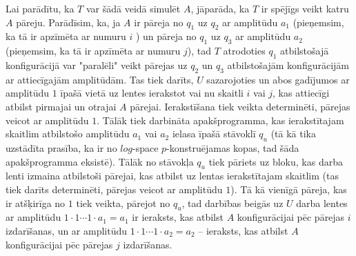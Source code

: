 \documentclass{ludis}
\begin{document}
Lai parādītu, ka $T$ var šādā veidā simulēt $A$, jāparāda, ka $T$ ir spējīgs veikt katru $A$ pāreju. Parādīsim, ka, ja $A$ ir pāreja no $q_1$ uz $q_2$ ar amplitūdu $a_1$ (pieņemsim, ka tā ir apzīmēta ar numuru $i$ ) un pāreja no $q_1$ uz $q_3$ ar amplitūdu $a_2$ (pieņemsim, ka tā ir apzīmēta ar numuru $j$), tad $T$ atrodoties $q_1$ atbilstošajā konfigurācijā var "paralēli" veikt pārejas uz $q_2$ un $q_3$ atbilstošajām konfigurācijām ar attiecīgajām amplitūdām. Tas tiek darīts, $U$ sazarojoties un abos gadījumos ar amplitūdu $1$ īpašā vietā uz lentes ierakstot vai nu skaitli $i$ vai $j$, kas attiecīgi atbilst pirmajai un otrajai $A$ pārejai. Ierakstīšana tiek veikta determinēti, pārejas veicot ar amplitūdu $1$. Tālāk tiek darbināta apakšprogramma, kas ierakstītajam skaitlim atbilstošo amplitūdu $a_1$ vai $a_2$ ielasa īpašā stāvoklī $q_u$ (tā kā tika uzstādīta prasība, ka ir no $log$-space $p$-konstruējamas kopas, tad šāda apakšprogramma eksistē). Tālāk no stāvokļa $q_u$ tiek pāriets uz bloku, kas darba lenti izmaina atbilstoši pārejai, kas atbilst uz lentas ierakstītajam skaitlim (tas tiek darīts determinēti, pārejas veicot ar amplitūdu $1$). Tā kā vienīgā pāreja, kas ir atšķirīga no $1$ tiek veikta, pārejot no $q_u$, tad darbības beigās uz $U$ darba lentes ar amplitūdu $1 \cdot 1 \cdots 1 \cdot a_1 = a_1$ ir ieraksts, kas atbilst $A$ konfigurācijai pēc pārejas $i$ izdarīšanas, un ar amplitūdu $1 \cdot 1 \cdots 1 \cdot a_2 = a_2$ -- ieraksts, kas atbilst $A$ konfigurācijai pēc pārejas $j$ izdarīšanas.

\end{document}
